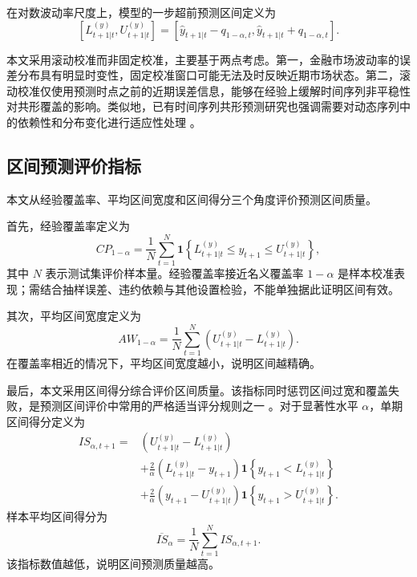 在对数波动率尺度上，模型的一步超前预测区间定义为
\begin{equation}
	\left[
	L^{(y)}_{t+1|t},
	U^{(y)}_{t+1|t}
	\right]
	=
	\left[
	\hat{y}_{t+1|t}-q_{1-\alpha,t},
	\hat{y}_{t+1|t}+q_{1-\alpha,t}
	\right].
\end{equation}

本文采用滚动校准而非固定校准，主要基于两点考虑。第一，金融市场波动率的误差分布具有明显时变性，固定校准窗口可能无法及时反映近期市场状态。第二，滚动校准仅使用预测时点之前的近期误差信息，能够在经验上缓解时间序列非平稳性对共形覆盖的影响。类似地，已有时间序列共形预测研究也强调需要对动态序列中的依赖性和分布变化进行适应性处理 \citep{XuXie2021}。

\subsection{区间预测评价指标}

本文从经验覆盖率、平均区间宽度和区间得分三个角度评价预测区间质量。

首先，经验覆盖率定义为
\begin{equation}
	CP_{1-\alpha}
	=
	\frac{1}{N}
	\sum_{t=1}^{N}
	\mathbf{1}
	\left\{
	L^{(y)}_{t+1|t}
	\leq
	y_{t+1}
	\leq
	U^{(y)}_{t+1|t}
	\right\},
\end{equation}
其中 \(N\) 表示测试集评价样本量。经验覆盖率接近名义覆盖率 \(1-\alpha\) 是样本校准表现；需结合抽样误差、违约依赖与其他设置检验，不能单独据此证明区间有效。

其次，平均区间宽度定义为
\begin{equation}
	AW_{1-\alpha}
	=
	\frac{1}{N}
	\sum_{t=1}^{N}
	\left(
	U^{(y)}_{t+1|t}
	-
	L^{(y)}_{t+1|t}
	\right).
\end{equation}
在覆盖率相近的情况下，平均区间宽度越小，说明区间越精确。

最后，本文采用区间得分综合评价区间质量。该指标同时惩罚区间过宽和覆盖失败，是预测区间评价中常用的严格适当评分规则之一 \citep{GneitingRaftery2007}。对于显著性水平 \(\alpha\)，单期区间得分定义为
\begin{equation}
	\begin{aligned}
		IS_{\alpha,t+1}
		=
		&
		\left(
		U^{(y)}_{t+1|t}
		-
		L^{(y)}_{t+1|t}
		\right)
		\\
		&
		+
		\frac{2}{\alpha}
		\left(
		L^{(y)}_{t+1|t}
		-
		y_{t+1}
		\right)
		\mathbf{1}
		\left\{
		y_{t+1}<L^{(y)}_{t+1|t}
		\right\}
		\\
		&
		+
		\frac{2}{\alpha}
		\left(
		y_{t+1}
		-
		U^{(y)}_{t+1|t}
		\right)
		\mathbf{1}
		\left\{
		y_{t+1}>U^{(y)}_{t+1|t}
		\right\}.
	\end{aligned}
\end{equation}
样本平均区间得分为
\begin{equation}
	\overline{IS}_{\alpha}
	=
	\frac{1}{N}
	\sum_{t=1}^{N}
	IS_{\alpha,t+1}.
\end{equation}
该指标数值越低，说明区间预测质量越高。

